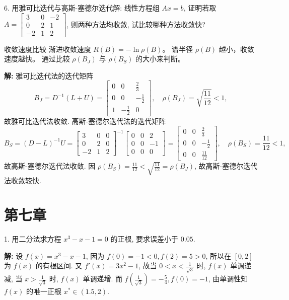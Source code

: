 \documentclass[a4paper,11pt]{ctexart}
\begin{document}
\vspace{2em}

6. 用雅可比迭代与高斯-塞德尔迭代解: 线性方程组
$Ax = b$, 证明若取 $A = \begin{bmatrix} 3 & 0 & -2 \\ 0 & 2 & 1 \\ -2 & 1 & 2 \end{bmatrix}$, 则两种方法均收敛, 试比较哪种方法收敛快?

\begin{theorybox}{收敛速度比较}
渐进收敛速度 $R(B) = -\ln \rho(B)$。
谱半径 $\rho(B)$ 越小，收敛速度越快。
通过比较 $\rho(B_J)$ 与 $\rho(B_S)$ 的大小来判断。
\end{theorybox}

\textbf{解: } 雅可比迭代法的迭代矩阵
\[
B_J = D^{-1}(L+U) = \begin{bmatrix}
0 & 0 & \frac{2}{3} \\
0 & 0 & -\frac{1}{2} \\
1 & -\frac{1}{2} & 0
\end{bmatrix}, \quad
\rho(B_J) = \sqrt{\frac{11}{12}} < 1,
\]
故雅可比迭代法收敛.
高斯-塞德尔迭代法的迭代矩阵
\[
B_S = (D-L)^{-1}U = \begin{bmatrix} 3 & 0 & 0 \\ 0 & 2 & 0 \\ -2 & 1 & 2 \end{bmatrix}^{-1}
\begin{bmatrix} 0 & 0 & 2 \\ 0 & 0 & -1 \\ 0 & 0 & 0 \end{bmatrix} =
\begin{bmatrix}
0 & 0 & \frac{2}{3} \\
0 & 0 & -\frac{1}{2} \\
0 & 0 & \frac{11}{12}
\end{bmatrix}, \quad
\rho(B_S) = \frac{11}{12} < 1,
\]
故高斯-塞德尔迭代法收敛.
因 $\rho(B_S) = \frac{11}{12} < \sqrt{\frac{11}{12}} = \rho(B_J)$, 故高斯-塞德尔迭代法收敛较快.

\newpage

\section{第七章}

1. 用二分法求方程 $x^3 - x - 1 = 0$ 的正根, 要求误差小于 $0.05$.

\textbf{解: } 设 $f(x) = x^3 - x - 1$, 因为 $f(0) = -1 < 0, f(2) = 5 > 0$, 所以在 $[0,2]$ 为 $f(x)$ 的有根区间.
又 $f'(x) = 3x^2 - 1$, 故当 $0 < x < \frac{1}{\sqrt{3}}$ 时, $f(x)$ 单调递减, 当 $x > \frac{1}{\sqrt{3}}$ 时, $f(x)$ 单调递增.
而 $f\left(\frac{1}{\sqrt{3}}\right) = -\frac{5}{4}, f(0) = -1$, 由单调性知 $f(x)$ 的唯一正根 $x^* \in (1.5, 2)$.
\end{document}

